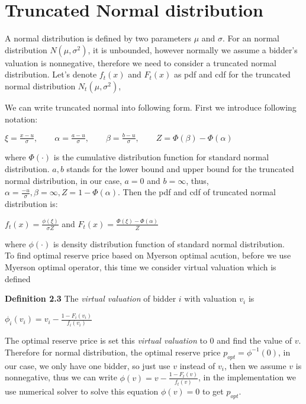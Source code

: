 \section{Truncated Normal distribution} \label{Normal distribution} 
A normal distribution is defined by two parameters $\mu$ and $\sigma$.
For an normal distribution $N(\mu, \sigma^2)$, it is unbounded, however normally we assume a bidder's valuation is nonnegative, therefore we need to consider a truncated normal distribution. Let's denote $f_t(x)$ and $F_t(x)$ as pdf and cdf for the truncated normal distribution $N_t(\mu, \sigma^2)$, 

We can write truncated normal into following form. First we introduce following notation:
\begin{center}
	$\xi = \frac{x-u}{\sigma}, \quad \quad \alpha = \frac{a - u}{\sigma},\quad \quad \beta = \frac{b-u}{\sigma}, \quad \quad Z = \Phi(\beta) - \Phi(\alpha)$ 
\end{center}
where $\Phi(\cdot)$ is the cumulative distribution function for standard normal distribution.
$a ,b$ stands for the lower bound and upper bound for the truncated normal distribution, in our case, $a = 0$ and $b = \infty$, thus, $ \alpha = \frac{- u}{\sigma}, \beta = \infty, Z = 1 - \Phi(\alpha)$. Then the pdf and cdf of truncated normal distribution is:
\begin{center}
	$f_t(x) = \frac{\phi(\xi)}{\sigma Z}$  \quad  and   \quad  $F_t(x) = \frac{\Phi(\xi) - \Phi(\alpha)}{Z}$ 
\end{center}

where $\phi (\cdot)$ is density distribution function of standard normal distribution.\\
To find optimal reserve price based on Myerson optimal acution, before we use Myerson optimal operator, this time we consider virtual valuation which is defined

\textbf{Definition 2.3} The \textit{virtual valuation} of bidder $i$ with valuation $v_i$ is 
\begin{center}
	$\phi_i(v_i) = v_i - \frac{1-F_i(v_i)}{f_i(v_i)}$ 
\end{center}

The optimal reserve price is set this \textit{virtual valuation} to 0 and find the value of $v$. Therefore for normal distribution, the optimal reserve price $p_{opt} = \phi^{-1}(0)$, in our case, we only have one bidder, so just use $v$ instead of $v_i$, then we assume $v$ is nonnegative, thus we can write $\phi(v) = v - \frac{1-F_t (v)}{f_t (v)}$, in the implementation we use numerical solver to solve this equation $\phi(v) = 0$ to get $p_{opt}$.\\


